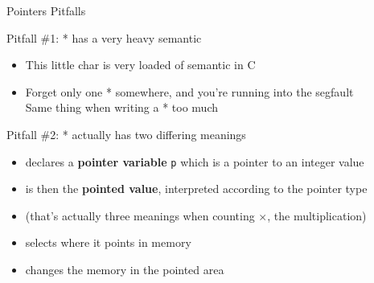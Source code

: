 \begin{Coupe}
\begin{frame}{Pointers Pitfalls}
  \begin{block}{Pitfall \#1: * has a very heavy semantic}
    \begin{itemize}
    \item This little char is very loaded of semantic in C
    \item Forget only one * somewhere, and you're running into the segfault\\
      Same thing when writing a * too much
    \end{itemize}
  \end{block}\vspace{-.5\baselineskip}

  \begin{block}{Pitfall \#2: * actually has two differing meanings}
    \begin{itemize}
    \item {} declares a \textbf{\alert{pointer
          variable}} \texttt{p} which is a pointer to an integer value
    \item {} is then the \textbf{\alert{pointed value}},
      interpreted according to the pointer type
    \item (that's actually three meanings when counting $\times$, the multiplication)
      \medskip
    \item {} selects where it points in memory
    \item {} changes the memory in the pointed area
      \medskip


\end{itemize}
\end{block}
\end{frame}
\end{Coupe}
